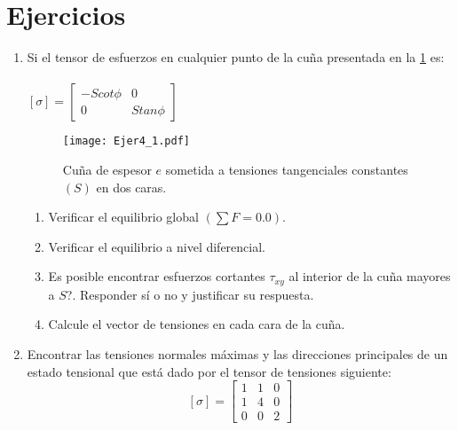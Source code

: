 \documentclass[../notas medios.tex]{subfiles}
\begin{document}
\section{Ejercicios}

\begin{enumerate}
  
\item \label{punto01} Si el tensor de esfuerzos en cualquier punto de la cu\~na
presentada en la \cref{figure4} es:\\
	\\
	$[\sigma] = \left[ \begin{array}{ccc}
	-S cot \phi & 0 \\ 
	0 & S tan \phi
	\end{array}  \right] $\\
	\begin{figure}[H]
		\centering
		\texttt{[image: Ejer4\_1.pdf]}
		\caption{Cuña de espesor $e$ sometida a tensiones tangenciales constantes $(S)$ en dos caras.}
		\label{figure4}
	\end{figure}
	\begin{enumerate}
		\item Verificar el equilibrio global $\left( \sum F = 0.0 \right)$.
		\item Verificar el equilibrio a nivel diferencial.
		\item  \textquestiondown Es posible encontrar esfuerzos cortantes $\tau_{xy}$ al interior de la cu\~na mayores a $S$?. Responder s\'i o no y justificar su respuesta.
		\item Calcule el vector de tensiones en cada cara de la cu\~na. 
	\end{enumerate}

\item \label{punto02} Encontrar las tensiones normales máximas y las direcciones
principales de un estado tensional que est\'a dado por el tensor de tensiones siguiente:
%
\[ [\sigma] = \left[ \begin{array}{ccc}
	1 & 1 & 0 \\ 
	1 & 4 & 0 \\ 
	0 & 0 & 2
\end{array}  \right]\]


\end{enumerate}
\end{document}
